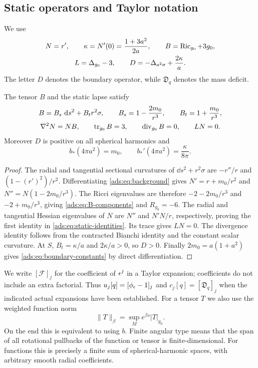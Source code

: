 \subsection{Static operators and Taylor notation}\label{ads:sec:taylor}

We use
\begin{equation}\label{ads:eq:static-operators}
 \begin{gathered}
 N=r',\qquad
 \kappa=N'(0)=\frac{1+3a^2}{2a},\qquad
 B=\operatorname{Ric}_{g_0}+3g_0,\\
 L=\Delta_{g_0}-3,\qquad
 D=-\Delta_{a^2\sigma}+\frac{2\kappa}{a}.
 \end{gathered}
\end{equation}
The letter $D$ denotes the boundary operator, while
$\mathfrak D_q$ denotes the mass deficit.

\begin{lemma}\label{ads:lem:static}
The tensor $B$ and the static lapse satisfy
\begin{gather}
 B=B_s\,\,\mathrm d s^2+B_t r^2\sigma,\qquad
 B_s=1-\frac{2m_0}{r^3},\qquad
 B_t=1+\frac{m_0}{r^3},\label{ads:eq:B-components}\\
 \nabla^2N=NB,\qquad
 \operatorname{tr}_{g_0}B=3,\qquad \operatorname{div}_{g_0}B=0,\qquad
 LN=0.\label{ads:eq:static-identities}
\end{gather}
Moreover $D$ is positive on all spherical harmonics and
\begin{equation}\label{ads:eq:boundary-constants}
 b_*(4\pi a^2)=m_0,\qquad
 b_*'(4\pi a^2)=\frac{\kappa}{8\pi}.
\end{equation}
\end{lemma}

\begin{proof}
The radial and tangential sectional curvatures of
$\dd s^2+r^2\sigma$ are $-r''/r$ and $(1-(r')^2)/r^2$.
Differentiating \eqref{ads:eq:background} gives
$N'=r+m_0/r^2$ and $N''=N(1-2m_0/r^3)$.
The Ricci eigenvalues are therefore $-2-2m_0/r^3$ and
$-2+m_0/r^3$, giving \eqref{ads:eq:B-components} and $R_{g_0}=-6$.
The radial and tangential Hessian eigenvalues of $N$ are
$N''$ and $N'N/r$, respectively, proving the first identity
in \eqref{ads:eq:static-identities}. Its trace gives $LN=0$.
The divergence identity follows from the contracted Bianchi
identity and the constant scalar curvature.
At $S$, $B_t=\kappa/a$ and $2\kappa/a>0$, so $D>0$.
Finally $2m_0=a(1+a^2)$ gives \eqref{ads:eq:boundary-constants}
by direct differentiation.
\end{proof}

We write $[\mathcal F]_j$ for the coefficient of $\epsilon^j$ in a
Taylor expansion; coefficients do not include an extra factorial.
Thus $u_j[q]=[\phi_\epsilon-1]_j$ and $c_j[q]=[\mathfrak D_q]_j$
when the indicated actual expansions have been established.
For a tensor $T$ we also use the weighted function norm
\[
 \|T\|_\beta=\sup_M e^{\beta s}|T|_{g_0}.
\]
On the end this is equivalent to using $b$.
Finite angular type means that the span of all rotational
pullbacks of the function or tensor is finite-dimensional.
For functions this is precisely a finite sum of spherical-harmonic
spaces, with arbitrary smooth radial coefficients.

